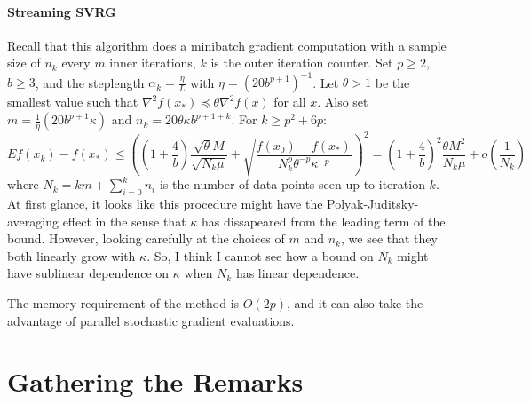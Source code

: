\documentclass{article}
\begin{document}
 \paragraph{Streaming SVRG}  Recall that this algorithm does a minibatch gradient computation with a sample size of $n_k$ every $m$ inner iterations, $k$ is the outer iteration counter.  Set $p\geq 2$, $b\geq 3$, and the steplength $\alpha_k=\displaystyle\frac{\eta}{L}$ with $\eta=(20b^{p+1})^{-1}$.  Let $\theta>1$ be the smallest value such that $\nabla^2f(x_\ast)\preceq \theta \nabla^2 f(x)$ for all $x$.  Also set $m=\frac{1}{\eta}(20b^{p+1}\kappa)$ and $n_k=20\theta \kappa b^{p+1+k}$.  For $k\geq p^2+6p$:
 \[
  Ef(x_k)-f(x_\ast) \leq \left(\left(1+\frac{4}{b}\right)\frac{\sqrt{\theta} M}{\sqrt{N_k\mu}} + \sqrt{\frac{f(x_0)-f(x_\ast)}{N_k^p \theta^{-p} \kappa^{-p}}}\right)^2 = \left(1+\frac{4}{b}\right)^2\frac{\theta M^2}{N_k\mu} + o(\frac{1}{N_k})  
 \]
where $N_k = km + \displaystyle\sum_{i=0}^k n_i$ is the number of data points seen up to iteration $k$.  At first glance, it looks like this procedure might have the Polyak-Juditsky-averaging effect in the sense that $\kappa$ has dissapeared from the leading term of the bound.  However, looking carefully at the choices of $m$ and $n_k$, we see that they both linearly grow with $\kappa$.  So, I think I cannot see how a bound on $N_k$ might have sublinear dependence on $\kappa$ when $N_k$ has linear dependence.

The memory requirement of the method is $O(2p)$, and it can also take the advantage of parallel stochastic gradient evaluations.
 
 \bigskip\bigskip
 
 \section{Gathering the Remarks}
  
\end{document}
